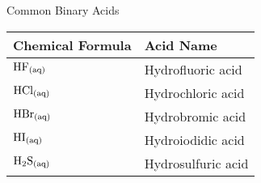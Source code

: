 \documentclass[12pt]{report}
\begin{document}
\begin{table}[h!] %
        
    \renewcommand{\arraystretch}{1.5} %
    \setlength{\tabcolsep}{10pt} %
    \setlength{\arrayrulewidth}{0.25mm}

    \begin{center}
        Common Binary Acids \\
        \vspace{0.5em}
        \begin{tabular}{|l|l|} %
        \hline
        Chemical Formula & Acid Name \\ %
        \hline
        $\ce{HF_{(aq)}}$ & Hydrofluoric acid \\ %
        \hline
        $\ce{HCl_{(aq)}}$ & Hydrochloric acid\\ 
        \hline
        $\ce{HBr_{(aq)}}$ & Hydrobromic acid\\
        \hline
        $\ce{HI_{(aq)}}$ & Hydroiodidic acid\\
        \hline 
        $\ce{H2S_{(aq)}}$ & Hydrosulfuric acid\\ 
        \hline
        \end{tabular}
    \end{center}
\end{table}
\end{document}
